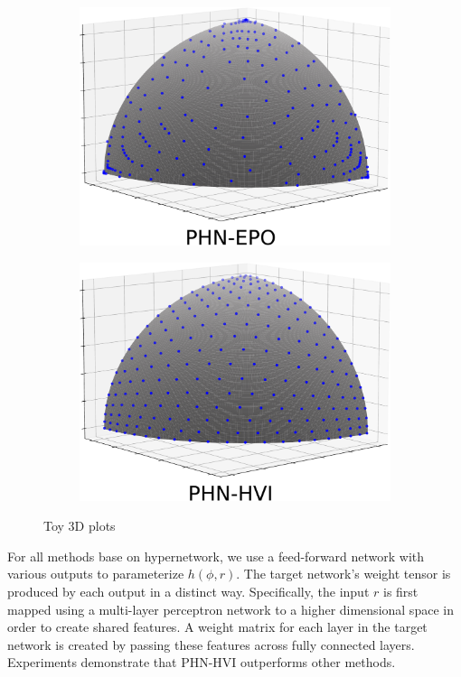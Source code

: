 \documentclass[letterpaper]{article} %
\newcommand{\ourmodel}{PHN-HVI }
\begin{document}
\begin{figure}[!htb]
\begin{subfigure}[b]{0.24\textwidth}
         \includegraphics[width=\textwidth]{figures/Toy_4_PHN-EPO.pdf}
     \end{subfigure}
     \hfill
     \begin{subfigure}[b]{0.24\textwidth}
         \centering
         \includegraphics[width=\textwidth]{figures/Toy_4_PHN-HVI.pdf}
     \end{subfigure}
      \caption{Toy 3D plots}
      \label{fig:3d}
\end{figure}


For all methods base on hypernetwork, we use a feed-forward network with various outputs to parameterize $h(\phi, r)$. The target network's weight tensor is produced by each output in a distinct way. Specifically, the input $r$ is first mapped using a multi-layer perceptron network to a higher dimensional space in order to create shared features. A weight matrix for each layer in the target network is created by passing these features across fully connected layers. Experiments demonstrate that \ourmodel outperforms other methods.
\end{document}
